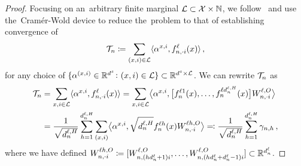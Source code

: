 \begin{proof}
Focusing on an~arbitrary finite marginal $\mathcal{L} \subset \mathcal{X} \times \mathbb{N}$, we follow \citeauthor{matthews2018gaussian}\ and use the~Cram{\' e}r-Wold device \citep[p.~383]{billingsey86} to reduce the~problem to that of establishing convergence of
\begin{equation}\label{eq:projection_def}
    \mathcal{T}_{n}
    \coloneqq
    \sum_{(x, i) \in \mathcal{L}}
        \langle 
            \alpha^{x, i} , 
            {f}^{\ell}_{n, \cdot i}{(x)}
        \rangle
    \, ,
\end{equation}
for any choice of $\{ \alpha^{(x, i)} \in \mathbb{R}^{d^s} \colon (x, i) \in \mathcal{L} \} \subset \mathbb{R}^{d^s \times \mathcal{L}}$.
We can rewrite $\mathcal{T}_{n}$ as
\begin{align*}
    \mathcal{T}_{n}
    &=
    \sum_{x, i \in \mathcal{L}}
        \langle 
            \alpha^{x, i} , 
            {f}^{\ell}_{n, \cdot i}{(x)}
        \rangle
    =
    \sum_{x, i \in \mathcal{L}}
        \bigl\langle 
            \alpha^{x, i} , 
            \bigl[
                {f}^{\ell 1}_{n}{(x)},
                \ldots,
                {f}^{\ell d_{n}^{\ell, H}}_{n}{(x)}
            \bigr]
            W_{n, \cdot i}^{\ell, O}
        \bigr\rangle
    \\
    &=
    \frac{1}{\sqrt{d_{n}^{\ell, H}}}
    \sum_{h = 1}^{d_{n}^{\ell, H}}
    \sum_{(x, i)}
        \bigl\langle
            \alpha^{x, i} , 
            \sqrt{d_{n}^{\ell, H}}
            {f}^{\ell h}_{n}{(x)}
            W_{n, \cdot i}^{\ell h, O}
        \bigr\rangle
    \eqqcolon
    \frac{1}{\sqrt{d_{n}^{\ell, H}}}
    \sum_{h = 1}^{d_{n}^{\ell, H}}
        \gamma_{n, h}
    \, ,
\end{align*}
where we have defined $W_{n, \cdot i}^{\ell h, O} \coloneqq [W_{n, (h d_{n}^{\ell} + 1) i}^{\ell, O}, \ldots, W_{n, (h d_{n}^{\ell} + d_{n}^{\ell} - 1) i}^{\ell, O}] \subset \mathbb{R}^{d_{n}^{\ell}}$.


\end{proof}
